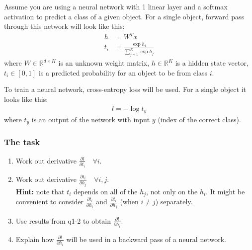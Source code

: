 \documentclass{article}
\begin{document}
Assume you are using a neural network with 1 linear layer and a softmax activation to predict a class of a given object. For a single object, forward pass through this network will look like this:
\begin{align}
    h &= W^Tx \\
    t_i &= \frac{\exp{h_i}}{\sum_{j=1}^K \exp{h_j}}
\end{align}
where $W \in \mathbb{R}^{d \times K}$ is an unknown weight matrix, $h \in \mathbb{R}^{K}$ is a hidden state vector, $t_i \in [0, 1]$ is a predicted probability for an object to be from class $i$.

To train a neural network, cross-entropy loss will be used. For a single object it looks like this:
\begin{align}
    l = -\log t_{y}
\end{align}
where $t_y$ is an output of the network with input $y$ (index of the correct class).


\subsubsection*{The task}

\begin{enumerate}
    \item Work out derivative $\frac{\partial l}{\partial t_i} \quad \forall i$.
    \item Work out derivative $\frac{\partial t_i}{\partial h_j} \quad \forall i, j$.\\
    \textbf{Hint:} note that $t_i$ depends on all of the $h_j$, not only on the $h_i$.
    It might be convenient to consider $\frac{\partial t_i}{\partial h_i}$ and $\frac{\partial t_i}{\partial h_j}$ (when $i \neq j$) separately.
    \item Use results from q1-2 to obtain $\frac{\partial l}{\partial h_i}$.
    \item Explain how $\frac{\partial l}{\partial h_i}$ will be used in a backward pass of a neural network.
\end{enumerate}
\end{document}
